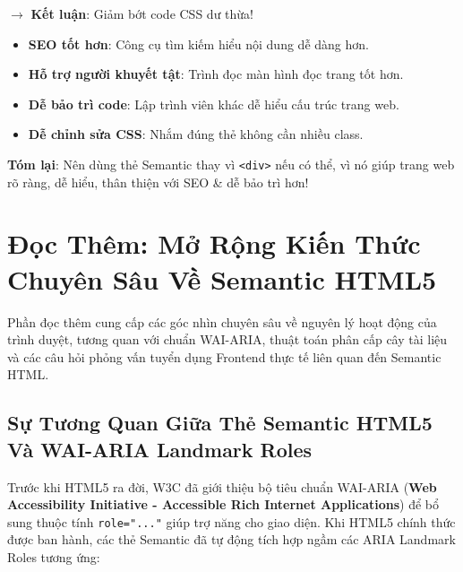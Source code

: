 \documentclass[11pt,oneside]{book}
\newcommand{\codeinline}[1]{\textcolor{accentOrange}{\texttt{#1}}}
\newcommand{\term}[1]{\textbf{\textcolor{primaryBlue}{#1}}}
\begin{document}
\begin{center}
$\rightarrow$ \textbf{Kết luận}: Giảm bớt code CSS dư thừa!
\end{center}

\begin{noteBox}
\begin{itemize}[leftmargin=1.5em, itemsep=3pt, parsep=0pt]
    \item \textbf{SEO tốt hơn}: Công cụ tìm kiếm hiểu nội dung dễ dàng hơn.
    \item \textbf{Hỗ trợ người khuyết tật}: Trình đọc màn hình đọc trang tốt hơn.
    \item \textbf{Dễ bảo trì code}: Lập trình viên khác dễ hiểu cấu trúc trang web.
    \item \textbf{Dễ chỉnh sửa CSS}: Nhắm đúng thẻ không cần nhiều class.
\end{itemize}
\textbf{Tóm lại}: Nên dùng thẻ Semantic thay vì \codeinline{<div>} nếu có thể, vì nó giúp trang web rõ ràng, dễ hiểu, thân thiện với SEO \& dễ bảo trì hơn!
\end{noteBox}

\Needspace*{120pt}
\section{Đọc Thêm: Mở Rộng Kiến Thức Chuyên Sâu Về Semantic HTML5}
\label{sec:semantic_html5_advanced_readmore}

Phần đọc thêm cung cấp các góc nhìn chuyên sâu về nguyên lý hoạt động của trình duyệt, tương quan với chuẩn WAI-ARIA, thuật toán phân cấp cây tài liệu và các câu hỏi phỏng vấn tuyển dụng Frontend thực tế liên quan đến Semantic HTML.

\subsection{Sự Tương Quan Giữa Thẻ Semantic HTML5 Và WAI-ARIA Landmark Roles}

Trước khi HTML5 ra đời, W3C đã giới thiệu bộ tiêu chuẩn WAI-ARIA (\term{Web Accessibility Initiative - Accessible Rich Internet Applications}) để bổ sung thuộc tính \codeinline{role="..."} giúp trợ năng cho giao diện. Khi HTML5 chính thức được ban hành, các thẻ Semantic đã tự động tích hợp ngầm các ARIA Landmark Roles tương ứng:
\end{document}
